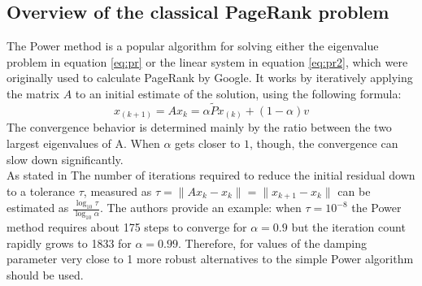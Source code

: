 \subsection{Overview of the classical PageRank problem}
The Power method is a popular algorithm for solving either the eigenvalue problem in equation \ref{eq:pr} or the linear system in equation \ref{eq:pr2}, which were originally used to calculate PageRank by Google. It works by iteratively applying the matrix $A$ to an initial estimate of the solution, using the following formula:
\begin{equation}\label{eq:power}
    x_{(k+1)} = Ax_k =\alpha \tilde P x_{(k)} + (1 - \alpha)v
\end{equation}
The convergence behavior is determined mainly by the ratio between the two largest eigenvalues of A. When $\alpha$ gets closer to $1$, though, the convergence can slow down significantly. \\

\noindent As stated in \cite{SHEN2022126799} The number of iterations required to reduce the initial residual down to a tolerance $\tau$, measured as $\tau = \lVert Ax_k - x_k \rVert = \lVert x_{k+1} - x_k \rVert$ can be estimated as $\frac{\log_{10} \tau}{\log_{10} \alpha}$. The authors provide an example: when $\tau = 10^{-8}$ the Power method requires about 175 steps to converge for $\alpha = 0.9$ but the iteration count rapidly grows to 1833 for $\alpha = 0.99$. Therefore, for values of the damping parameter very close to 1 more robust alternatives to the simple Power algorithm should be used.

